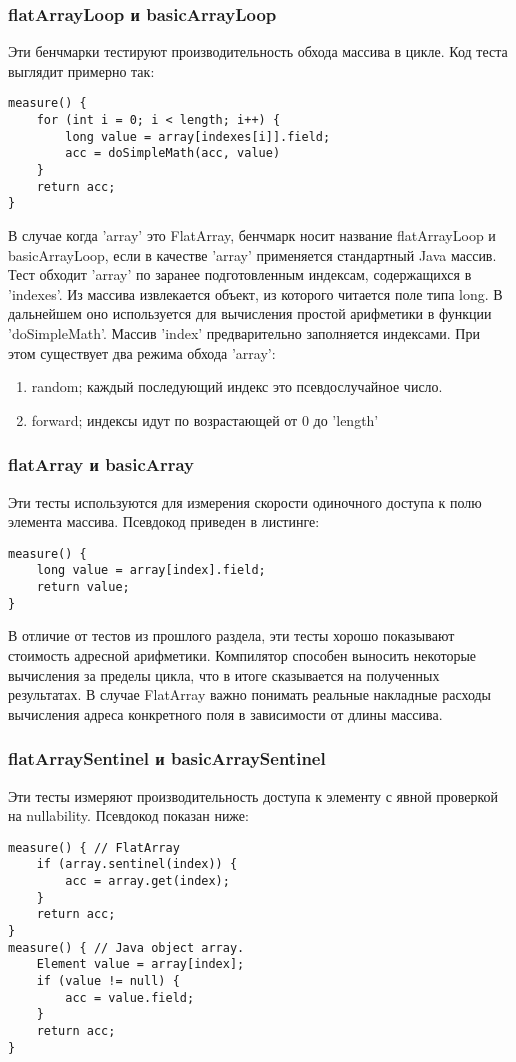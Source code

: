 \subsubsection{flatArrayLoop и basicArrayLoop}
Эти бенчмарки тестируют производительность обхода массива в цикле. Код теста выглядит примерно так:
\begin{lstlisting}
measure() {
	for (int i = 0; i < length; i++) {
		long value = array[indexes[i]].field;
		acc = doSimpleMath(acc, value)
	}
    return acc;
}
\end{lstlisting}
В случае когда 'array' это FlatArray, бенчмарк носит название flatArrayLoop и basicArrayLoop, если в качестве 'array' применяется стандартный Java массив.
Тест обходит 'array' по заранее подготовленным индексам, содержащихся в 'indexes'. 
Из массива извлекается объект, из которого читается поле типа long. В дальнейшем оно используется для вычисления простой арифметики в функции 'doSimpleMath'. 
Массив 'index' предварительно заполняется индексами. При этом существует два режима обхода 'array':
\begin{enumerate}
	\item random; каждый последующий индекс это псевдослучайное число.
	\item forward; индексы идут по возрастающей от 0 до 'length'
\end{enumerate}

\subsubsection{flatArray и basicArray}
Эти тесты используются для измерения скорости одиночного доступа к полю элемента массива. Псевдокод приведен в листинге:
\begin{lstlisting}
measure() {
	long value = array[index].field;
	return value;
}
\end{lstlisting}
В отличие от тестов из прошлого раздела, эти тесты хорошо показывают стоимость адресной арифметики. 
Компилятор способен выносить некоторые вычисления за пределы цикла, что в итоге сказывается на полученных результатах.
В случае FlatArray важно понимать реальные накладные расходы вычисления адреса конкретного поля в зависимости от длины массива.
\subsubsection{flatArraySentinel и basicArraySentinel}
Эти тесты измеряют производительность доступа к элементу с явной проверкой на nullability. Псевдокод показан ниже:
\begin{lstlisting}
measure() { // FlatArray
	if (array.sentinel(index)) {
		acc = array.get(index);
	}
	return acc;
}
measure() { // Java object array.
	Element value = array[index];
	if (value != null) {
		acc = value.field;
	}
	return acc;
}
\end{lstlisting}
